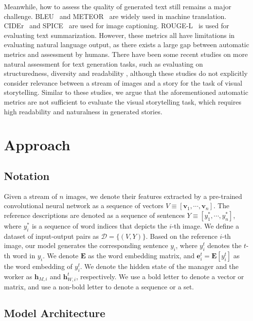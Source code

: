 \documentclass[letterpaper]{article} \usepackage{aaai20}  \usepackage{times}  \usepackage{helvet} \usepackage{courier}  \usepackage[hyphens]{url}  \usepackage{graphicx} \urlstyle{rm} \def\UrlFont{\rm}  \usepackage{graphicx}  \frenchspacing  \setlength{\pdfpagewidth}{8.5in}  \setlength{\pdfpageheight}{11in}  \usepackage{times}
\newcommand{\hb}{\mathbf{h}}
\newcommand{\vb}{\mathbf{v}}
\newcommand{\eb}{\mathbf{e}}
\newcommand{\Eb}{\mathbf{E}}
\newcommand{\Dcal}{\mathcal{D}}
\begin{document}
Meanwhile, how to assess the quality of generated text still remains a major challenge. BLEU~\cite{papineni2002bleu} and METEOR~\cite{banerjee2005meteor} are widely used in machine translation. CIDEr~\cite{vedantam2015cider} and SPICE~\cite{anderson2016spice} are used for image captioning. ROUGE-L~\cite{lin2004rouge} is used for evaluating text summarization. However, these metrics all have limitations in evaluating natural language output, as there exists a large gap between automatic metrics and assessment by humans. There have been some recent studies on more natural assessment for text generation tasks, such as evaluating on structuredness, diversity and readability \cite{plainandwrite,dai17,chen2018fast,xinwang-wenhuchen-ACL-2018}, although these studies do not explicitly consider relevance between a stream of images and a story for the task of visual storytelling. Similar to these studies, we argue that the aforementioned automatic metrics are not sufficient to evaluate the visual storytelling task, which requires high readability and naturalness in generated stories.

\section{Approach}


\subsection{Notation}
Given a stream of $n$ images, we denote their features extracted by a pre-trained convolutional neural network as a sequence of vectors $V\equiv[\vb_1,\cdots, \vb_n]$. The reference descriptions are denoted as a sequence of sentences $Y\equiv[y^*_1,\cdots, y^*_n]$, where $y^*_i$ is a sequence of word indices that depicts the $i$-th image. We define a dataset of input-output pairs as $\Dcal=\{(V, Y)\}$. Based on the reference $i$-th image, our model generates the corresponding sentence $y_i$, where $y_i^t$ denotes the $t$-th word in $y_i$. We denote $\Eb$ as the word embedding matrix, and $\eb_i^t=\Eb[y_i^t]$ as the word embedding of $y_i^t$. We denote the hidden state of the manager and the worker as $\hb_{M,i}$ and $\hb_{W,i}^t$, respectively. We use a bold letter to denote a vector or matrix, and use a non-bold letter to denote a sequence or a set.

\subsection{Model Architecture}
\label{sec:model}
\end{document}
